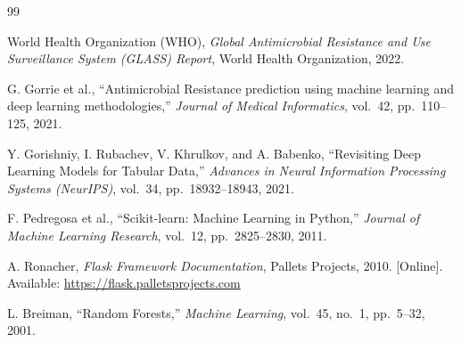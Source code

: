\documentclass[12pt,a4paper]{report}
\begin{document}
\begin{thebibliography}{99}

World Health Organization (WHO),
\textit{Global Antimicrobial Resistance and Use Surveillance System (GLASS) Report},
World Health Organization, 2022.

G. Gorrie et al.,
``Antimicrobial Resistance prediction using machine learning and deep learning methodologies,''
\textit{Journal of Medical Informatics}, vol.~42, pp.~110--125, 2021.

Y. Gorishniy, I. Rubachev, V. Khrulkov, and A. Babenko,
``Revisiting Deep Learning Models for Tabular Data,''
\textit{Advances in Neural Information Processing Systems (NeurIPS)},
vol.~34, pp.~18932--18943, 2021.

F. Pedregosa et al.,
``Scikit-learn: Machine Learning in Python,''
\textit{Journal of Machine Learning Research}, vol.~12, pp.~2825--2830, 2011.

A. Ronacher,
\textit{Flask Framework Documentation},
Pallets Projects, 2010.
[Online]. Available: \url{https://flask.palletsprojects.com}

L. Breiman,
``Random Forests,''
\textit{Machine Learning}, vol.~45, no.~1, pp.~5--32, 2001.

\end{thebibliography}
\end{document}
